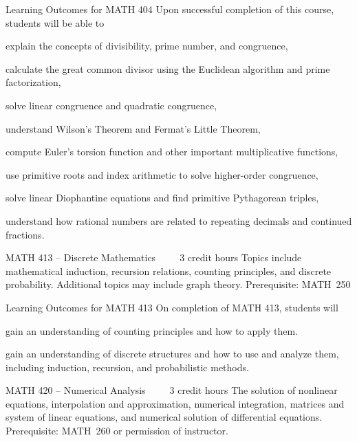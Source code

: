 Learning Outcomes for MATH 404
Upon successful completion of this course, students will be able to
    \item explain the concepts of divisibility, prime number, and congruence, 
    \item calculate the great common divisor using the Euclidean algorithm and prime factorization, 
    \item solve linear congruence and quadratic congruence, 
    \item understand Wilson’s Theorem and Fermat’s Little Theorem, 
    \item compute Euler's torsion function and other important multiplicative functions,
    \item use primitive roots and index arithmetic to solve higher-order congruence,  
    \item solve linear Diophantine equations and find primitive Pythagorean triples,
    \item understand how rational numbers are related to repeating decimals and continued fractions.

MATH 413 – Discrete Mathematics     3 credit hours
Topics include mathematical induction, recursion relations, counting principles, and discrete probability. Additional topics may include graph theory.
Prerequisite: MATH 250

Learning Outcomes for MATH 413
On completion of MATH 413, students will 
    \item gain an understanding of counting principles and how to apply them.
    \item gain an understanding of discrete structures and how to use and analyze them, including induction, recursion, and probabilistic methods.

MATH 420 – Numerical Analysis     3 credit hours
The solution of nonlinear equations, interpolation and approximation, numerical integration, matrices and system of linear equations, and numerical solution of differential equations.
Prerequisite: MATH 260 or permission of instructor.

